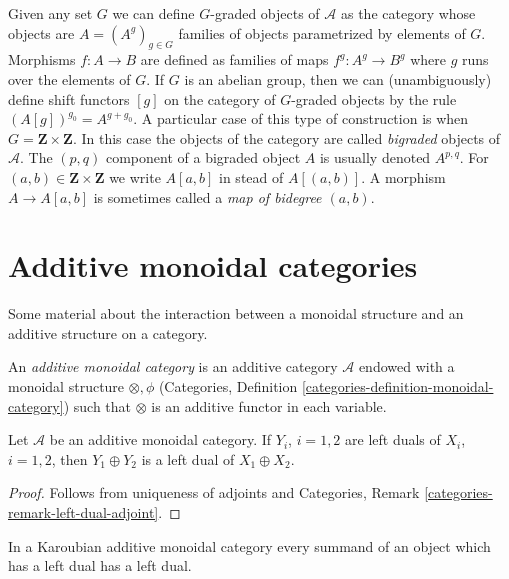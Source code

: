 \medskip\noindent
Given any set $G$ we can define $G$-graded objects of $\mathcal{A}$
as the category whose objects are $A = (A^g)_{g \in G}$
families of objects parametrized by elements of $G$. Morphisms
$f : A \to B$ are defined as families of maps $f^g : A^g \to B^g$
where $g$ runs over the elements of $G$. If $G$ is an abelian group,
then we can (unambiguously) define shift functors $[g]$ on the category
of $G$-graded objects by the rule $(A[g])^{g_0} = A^{g + g_0}$.
A particular case of this type of construction is when
$G = \mathbf{Z} \times \mathbf{Z}$. In this case the objects of
the category are called {\it bigraded} objects of $\mathcal{A}$.
The $(p, q)$ component of a bigraded object $A$ is usually denoted
$A^{p, q}$. For $(a, b) \in \mathbf{Z} \times \mathbf{Z}$ we write
$A[a, b]$ in stead of $A[(a, b)]$.
A morphism $A \to A[a, b]$ is sometimes called a
{\it map of bidegree $(a, b)$}.







\section{Additive monoidal categories}
\label{section-monoidal}

\noindent
Some material about the interaction between a monoidal structure
and an additive structure on a category.

\begin{definition}
\label{definition-additive-monoidal}
An {\it additive monoidal category} is an additive category $\mathcal{A}$
endowed with a monoidal structure $\otimes, \phi$
(Categories, Definition \ref{categories-definition-monoidal-category})
such that $\otimes$ is an additive functor in each variable.
\end{definition}

\begin{lemma}
\label{lemma-additive-dual}
Let $\mathcal{A}$ be an additive monoidal category.
If $Y_i$, $i = 1, 2$ are left duals of $X_i$, $i = 1, 2$, then
$Y_1 \oplus Y_2$ is a left dual of $X_1 \oplus X_2$.
\end{lemma}

\begin{proof}
Follows from uniqueness of adjoints and
Categories, Remark \ref{categories-remark-left-dual-adjoint}.
\end{proof}

\begin{lemma}
\label{lemma-Karoubian-dual}
In a Karoubian additive monoidal category every summand
of an object which has a left dual has a left dual.
\end{lemma}


